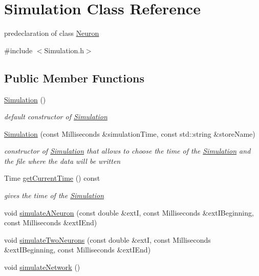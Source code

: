 \hypertarget{classSimulation}{}\section{Simulation Class Reference}
\label{classSimulation}


predeclaration of class \hyperlink{classNeuron}{Neuron}  




{\ttfamily \#include $<$Simulation.\+h$>$}

\subsection*{Public Member Functions}
\begin{DoxyCompactItemize}
\item 
\hyperlink{classSimulation_a5b224cc5b36bcc8eb29689aff223de41}{Simulation} ()
\begin{DoxyCompactList}\small\item\em default constructor of \hyperlink{classSimulation}{Simulation} \end{DoxyCompactList}\item 
\hyperlink{classSimulation_ae450f79abac7a43794aa946c2c708a79}{Simulation} (const Milliseconds \&simulation\+Time, const std\+::string \&store\+Name)
\begin{DoxyCompactList}\small\item\em constructor of \hyperlink{classSimulation}{Simulation} that allows to choose the time of the \hyperlink{classSimulation}{Simulation} and the file where the data will be written \end{DoxyCompactList}\item 
Time \hyperlink{classSimulation_a95bb6273bcc774ad750242db5bc5a58b}{get\+Current\+Time} () const 
\begin{DoxyCompactList}\small\item\em gives the time of the \hyperlink{classSimulation}{Simulation} \end{DoxyCompactList}\item 
void \hyperlink{classSimulation_a87d231aa29cd6fa002db42255809eebc}{simulate\+A\+Neuron} (const double \&extI, const Milliseconds \&ext\+I\+Beginning, const Milliseconds \&ext\+I\+End)
\item 
void \hyperlink{classSimulation_a4f14cd93475b42b2c7820429c11310ec}{simulate\+Two\+Neurons} (const double \&extI, const Milliseconds \&ext\+I\+Beginning, const Milliseconds \&ext\+I\+End)
\item 
void \hyperlink{classSimulation_adac9da47097e52547c8fada8a1d9ba46}{simulate\+Network} ()
\end{DoxyCompactItemize}


